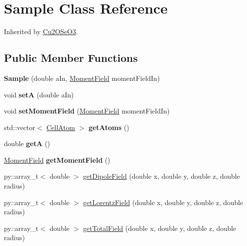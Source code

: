 \hypertarget{class_sample}{}\section{Sample Class Reference}
\label{class_sample}


Inherited by \mbox{\hyperlink{class_cu2_o_se_o3}{Cu2\+O\+Se\+O3}}.

\subsection*{Public Member Functions}
\begin{DoxyCompactItemize}
\item 
\mbox{\label{class_sample_ad18c855def3c90c997501c4a270229d4}} 
{\bfseries Sample} (double a\+In, \mbox{\hyperlink{class_moment_field}{Moment\+Field}} moment\+Field\+In)
\item 
\mbox{\label{class_sample_ad50c28825937880216f85375f71c20dd}} 
void {\bfseries setA} (double a\+In)
\item 
\mbox{\label{class_sample_a0569958ba8c7b59127f75c9026adff10}} 
void {\bfseries set\+Moment\+Field} (\mbox{\hyperlink{class_moment_field}{Moment\+Field}} moment\+Field\+In)
\item 
\mbox{\label{class_sample_a2d0d96d4a0ef717d69def676de75abd0}} 
std\+::vector$<$ \mbox{\hyperlink{class_cell_atom}{Cell\+Atom}} $>$ {\bfseries get\+Atoms} ()
\item 
\mbox{\label{class_sample_a693eb5a6dfc3a4f436d4b7c135b0f23c}} 
double {\bfseries getA} ()
\item 
\mbox{\label{class_sample_aed78766e8b673cf0390beb3e1702e471}} 
\mbox{\hyperlink{class_moment_field}{Moment\+Field}} {\bfseries get\+Moment\+Field} ()
\item 
py\+::array\+\_\+t$<$ double $>$ \mbox{\hyperlink{class_sample_a3ca721744b709a5a6e76705b7583a31c}{get\+Dipole\+Field}} (double x, double y, double z, double radius)
\item 
py\+::array\+\_\+t$<$ double $>$ \mbox{\hyperlink{class_sample_aae12567d502fcc6bbd2a6a5e390250a4}{get\+Lorentz\+Field}} (double x, double y, double z, double radius)
\item 
py\+::array\+\_\+t$<$ double $>$ \mbox{\hyperlink{class_sample_ab500cba49bb9ec691d668cf8d82d1ea4}{get\+Total\+Field}} (double x, double y, double z, double radius)
\end{DoxyCompactItemize}
